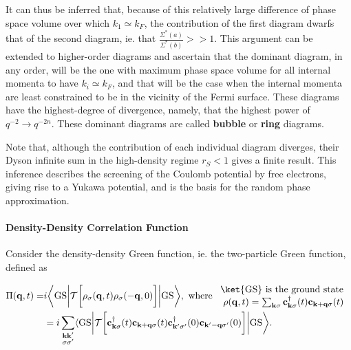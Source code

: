 It can thus be inferred that, because of this relatively large difference of phase space volume over which $k_1 \simeq k_F$, the contribution of the first diagram dwarfs that of the second diagram, ie. that $
    \frac{\Sigma^{*}(a)}{\Sigma^{*}(b)} >> 1.  $ 
This argument can be extended to higher-order diagrams and ascertain that the dominant diagram, in any order, will be the one with maximum phase space volume for all internal momenta to have $k_i \simeq k_F$, and that will be the case when the internal momenta are least constrained to be in the vicinity of the Fermi surface. These diagrams have the highest-degree of divergence, namely, that the highest power of $q^{-2} \rightarrow q^{-2n}$. These dominant diagrams are called \textbf{bubble} or \textbf{ring} diagrams. 

Note that, although the contribution of each individual diagram diverges, their Dyson infinite sum in the high-density regime $r_S < 1$ gives a finite result. This inference describes the screening of the Coulomb potential by free electrons, giving rise to a Yukawa potential, and is the basis for the random phase approximation. \\

\clearpage

\paragraph{Density-Density Correlation Function}

Consider the density-density Green function, ie. the two-particle Green function, defined as 

\begin{equation}
\begin{split}
    \Pi({\bf q},t) =& i \bigg \langle \textnormal{GS} \bigg | \mathcal{T} \bigg[\rho_{\sigma}({\bf q},t) \rho_{\sigma}(-{\bf q},0)\bigg] \bigg | \textnormal{GS} \bigg \rangle, \textnormal{ where } \begin{array}{cc}
        \ket{\textnormal{GS}} \textnormal{ is the ground state } \\
        \rho({\bf q},t) = \sum_{{\bf k} \sigma} {\bf c}_{{\bf k} \sigma}^\dagger(t) {\bf c}_{{{\bf k+q} \sigma}}(t)
    \end{array} \\
    &= i \sum_{{\substack{ {\bf k k'}
    \\
    \sigma \sigma'
    }}} \langle \textnormal{GS} \bigg | \mathcal{T} \bigg[ 
      {\bf c}_{{\bf k} \sigma}^\dagger(t) 
      {\bf c}_{{{\bf k+q} \sigma}}(t)
      {\bf c}_{{\bf k}' \sigma'}^\dagger(0) {\bf c}_{{{\bf k'-q} \sigma'}}(0)
    \bigg] \bigg | \textnormal{GS} \bigg \rangle.
\end{split}
\label{HFRPA_density_density_gf}
\end{equation}

